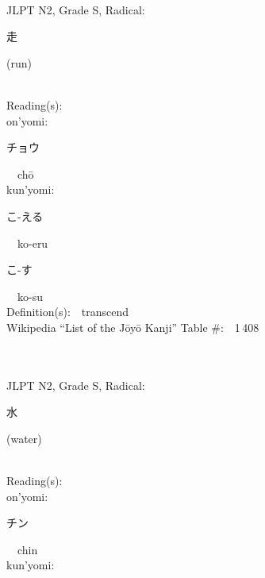 \begin{multicols}{2}
{\fontsize{34pt}{40pt}  }\ \ \\  %
{JLPT N2, Grade S, Radical:\ \ {\begin{CJK}{UTF8}{min} 走 \end{CJK}} (run) } \\
Reading(s):\ \ \\
{\hspace*{1em}}on'yomi:\ \ \\
{\hspace*{2em}}{\begin{CJK}{UTF8}{min} チョウ \end{CJK}}\ \ ch\=o\ \ \\
{\hspace*{1em}}kun'yomi:\ \ \\
{\hspace*{2em}}{\begin{CJK}{UTF8}{min} こ-える \end{CJK}}\ \ ko-eru\ \ \\
{\hspace*{2em}}{\begin{CJK}{UTF8}{min} こ-す \end{CJK}}\ \ ko-su\ \ \\
Definition(s):\ \ transcend \\
Wikipedia ``List of the J\=oy\=o Kanji'' Table \#:\ \ 1\,408 \\
\ \ \\
{\fontsize{34pt}{40pt}  }\ \ \\  %
{JLPT N2, Grade S, Radical:\ \ {\begin{CJK}{UTF8}{min} 水 \end{CJK}} (water) } \\
Reading(s):\ \ \\
{\hspace*{1em}}on'yomi:\ \ \\
{\hspace*{2em}}{\begin{CJK}{UTF8}{min} チン \end{CJK}}\ \ chin\ \ \\
{\hspace*{1em}}kun'yomi:\ \ \\

\end{multicols}
